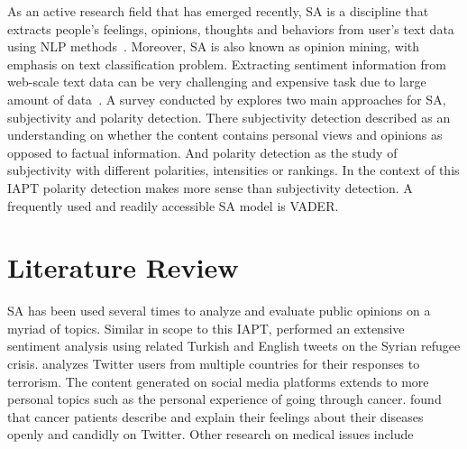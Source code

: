 As an active research field that has emerged recently, \ac{SA} is a discipline that extracts people’s feelings, opinions, thoughts and behaviors from user’s text data using \ac{NLP} methods~\citep{danneman2014social}.
Moreover, \ac{SA} is also known as opinion mining, with emphasis on text classification problem.
Extracting sentiment information from web-scale text data can be very challenging and expensive task due to large amount of data~\citep{FernndezGavilanes2016}.
A survey conducted by \citet{Lo2016} explores two main approaches for \ac{SA}, subjectivity and polarity detection.
There subjectivity detection described as an understanding on whether the content contains personal views and opinions as opposed to factual information.
And polarity detection as the study of subjectivity with different polarities, intensities or rankings.
In the context of this \ac{IAPT} polarity detection makes more sense than subjectivity detection.
A frequently used and readily accessible \ac{SA} model is \ac{VADER}.



\section{Literature Review}

\ac{SA} has been used several times to analyze and evaluate public opinions on a myriad of topics.
Similar in scope to this \ac{IAPT}, \citet{ztrk2018} performed an extensive sentiment analysis using related Turkish and English tweets on the Syrian refugee crisis.
\citet{MANSOUR201895} analyzes Twitter users from multiple countries for their responses to terrorism.
The content generated on social media platforms extends to more personal topics such as the personal experience of going through cancer.
\citet{Crannell2016} found that cancer patients describe and explain their feelings about their diseases openly and candidly on Twitter.
Other research on medical issues include~\citep{lampos2010flu, corley2010text, culotta2010towards, broniatowski2013national, elkin2017network}
